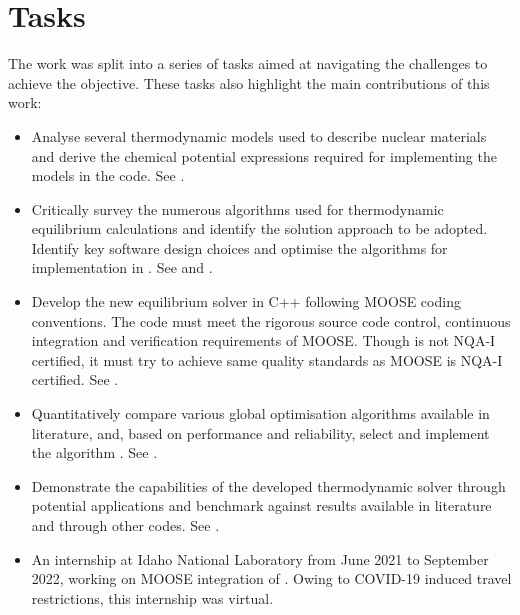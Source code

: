 \section{Tasks}
    The work was split into a series of tasks aimed at navigating the challenges to achieve the objective. These tasks also highlight the main contributions of this work:
    \begin{itemize}
        \item Analyse several thermodynamic models used to describe nuclear materials and derive the chemical potential expressions required for implementing the models in the code. See .
        \item Critically survey the numerous algorithms used for thermodynamic equilibrium calculations and identify the solution approach to be adopted. Identify key software design choices and optimise the algorithms for implementation in {\GEM}. See  and .
        \item Develop the new equilibrium solver in C++ following MOOSE coding conventions. The code must meet the rigorous source code control, continuous integration and verification requirements of MOOSE. Though {\GEM} is not NQA-I certified, it must try to achieve same quality standards as MOOSE is NQA-I certified. See .
        \item Quantitatively compare various global optimisation algorithms available in literature, and, based on performance and reliability, select and implement the algorithm {\GEM}. See .
        \item Demonstrate the capabilities of the developed thermodynamic solver through potential applications and benchmark against results available in literature and through other codes. See .
        \item An internship at Idaho National Laboratory from June 2021 to September 2022, working on MOOSE integration of \GEM. Owing to COVID-19 induced travel restrictions, this internship was virtual.
    \end{itemize}

